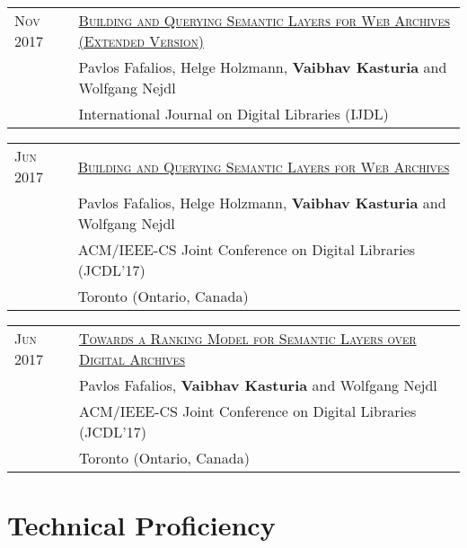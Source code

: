 \documentclass[a4paper,10pt]{article} %
\begin{document}
\begin{tabular}{ll}
\textsc{Nov 2017} & \href{https://arxiv.org/abs/1810.10455}{\textsc{Building and Querying Semantic Layers for Web Archives (Extended Version)}}\\
& Pavlos Fafalios, Helge Holzmann, \textbf{Vaibhav Kasturia} and Wolfgang Nejdl\\
& International Journal on Digital Libraries (IJDL)\\
\end{tabular}

\begin{tabular}{ll}

\textsc{Jun 2017} & \href{http://ieeexplore.ieee.org/document/7991555/}{\textsc{Building and Querying Semantic Layers for Web Archives}}\\
& Pavlos Fafalios, Helge Holzmann, \textbf{Vaibhav Kasturia} and Wolfgang Nejdl\\
& ACM/IEEE-CS Joint Conference on Digital Libraries (JCDL’17)\\
& Toronto (Ontario, Canada)\\
\end{tabular}

\begin{tabular}{ll}
\textsc{Jun 2017} & \href{http://ieeexplore.ieee.org/document/7991617/}{\textsc{Towards a Ranking Model for Semantic Layers over 
Digital Archives}}\\
& Pavlos Fafalios, \textbf{Vaibhav Kasturia} and Wolfgang Nejdl\\
& ACM/IEEE-CS Joint Conference on Digital Libraries (JCDL’17)\\
& Toronto (Ontario, Canada)\\
\end{tabular}



\section{Technical Proficiency}
\end{document}
